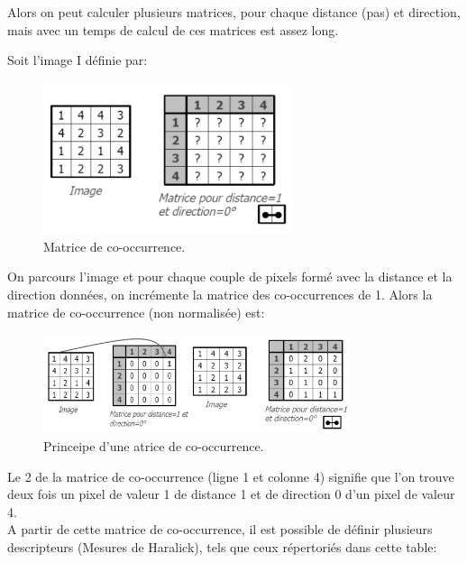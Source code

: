 Alors on peut calculer plusieurs matrices, pour chaque distance (pas) et direction, mais avec un temps de calcul de ces matrices est assez long.

Soit l’image I définie par:

\begin{figure}[H]
	\label{fig:cooc}
	\centering
	\includegraphics[width=0.65\textwidth]{Figures/cooc} %
	\caption{Matrice de co-occurrence.}
\end{figure}

On parcours l'image et pour chaque couple de pixels formé avec la distance et la direction données, on incrémente la matrice des co-occurrences de 1. Alors la matrice de co-occurrence (non normalisée) est:

\begin{figure}[H]
	\label{fig:cooc_nn}
	\centering
	\includegraphics[width=0.8\textwidth]{Figures/cooc_non_norm} %
	\caption{Princeipe d'une atrice de co-occurrence.}
\end{figure}

Le 2 de la matrice de co-occurrence (ligne 1 et colonne 4) signifie que l’on trouve deux fois un pixel de valeur 1 de distance 1 et de direction
0 d’un pixel de valeur 4.\\


A partir de cette matrice de co-occurrence, il est possible de définir plusieurs descripteurs (Mesures de Haralick), tels que ceux répertoriés dans cette table:


